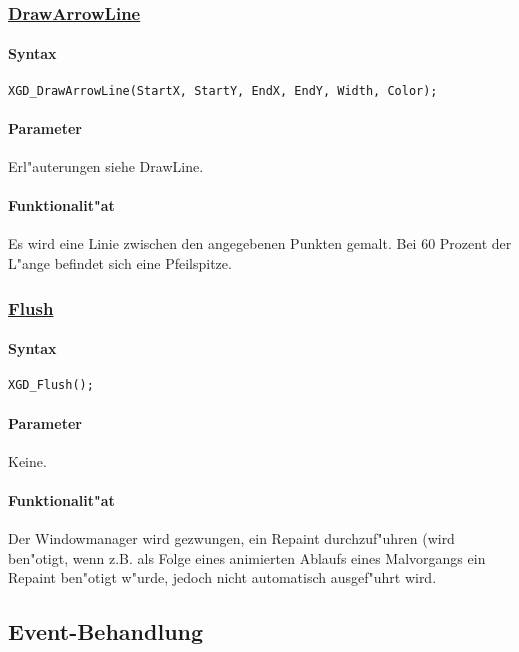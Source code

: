 \subsubsection{\underline{DrawArrowLine}}

\paragraph{Syntax}
\begin{verbatim}
XGD_DrawArrowLine(StartX, StartY, EndX, EndY, Width, Color);
\end{verbatim}

\paragraph{Parameter}
Erl"auterungen siehe DrawLine.

\paragraph{Funktionalit"at}
Es wird eine Linie zwischen den angegebenen Punkten gemalt. Bei 60 Prozent
der L"ange befindet sich eine Pfeilspitze.

\subsubsection{\underline{Flush}}

\paragraph{Syntax}
\begin{verbatim}
XGD_Flush();
\end{verbatim}

\paragraph{Parameter}
Keine.

\paragraph{Funktionalit"at}
Der Windowmanager wird gezwungen, ein Repaint durchzuf"uhren (wird ben"otigt,
wenn z.B. als Folge eines animierten Ablaufs eines Malvorgangs ein Repaint
ben"otigt w"urde, jedoch nicht automatisch ausgef"uhrt wird.

\subsection{Event-Behandlung\label{XGE}}


